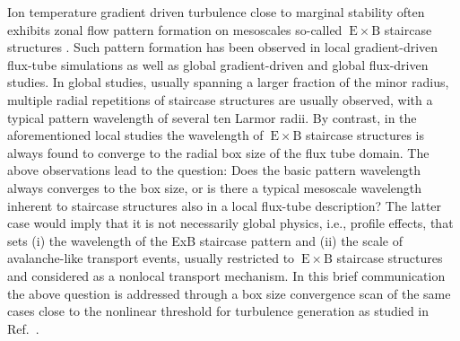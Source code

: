 \documentclass[aip, amsmath, amssymb, reprint, twocolumn]{revtex4-1}
\newcommand{\exb}{\mathrm{\:E}\times\mathrm{B}}
\begin{document}
Ion temperature gradient driven turbulence close to marginal stability often exhibits zonal flow pattern formation on mesoscales \textemdash so-called $\exb$ staircase structures \cite{pradalier2010}.
Such pattern formation has been observed in local gradient-driven flux-tube simulations \cite{peeters2016, weikl2017, rath2021} as well as global gradient-driven \cite{mcmillan2009, villard2013, seo2022} and global flux-driven \cite{pradalier2010, pradalier2015, wang2020, kim2022, kishimoto2023} studies. 
In global studies, usually spanning a larger fraction of the minor radius, multiple radial repetitions of staircase structures are usually observed, with a typical pattern wavelength of several ten Larmor radii.
By contrast, in the aforementioned local studies the wavelength of $\exb$ staircase structures is always found to converge to the radial box size of the flux tube domain.
The above observations lead to the question: 
Does the basic pattern wavelength always converges to the box size, or is there a typical mesoscale wavelength inherent to staircase structures also in a local flux-tube description?
The latter case would imply that it is not necessarily global physics, i.e., profile effects, that sets (i) the wavelength of the ExB staircase pattern and (ii) the scale of avalanche-like transport events, usually restricted to $\exb$ staircase structures and considered as a nonlocal transport mechanism\cite{pradalier2010}. 
In this brief communication the above question is addressed through a box size convergence scan of the same cases close to the nonlinear threshold for turbulence generation as studied in Ref.~\cite{peeters2016}.\bigskip

\end{document}
